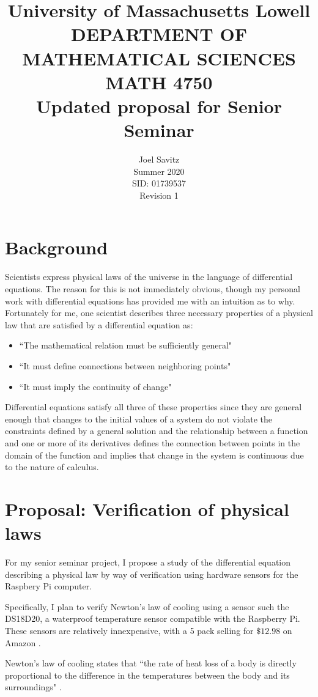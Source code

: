 \documentclass[12pt]{amsart}
\title{ University of Massachusetts Lowell \protect\\
	DEPARTMENT OF MATHEMATICAL SCIENCES \protect\\
MATH 4750 \protect\\
Updated proposal for Senior Seminar}
\author{Joel Savitz \\ Summer  2020 \\ SID: 01739537 \\ Revision 1}
\begin{document}
\maketitle

\section{Background}

Scientists express physical laws of
the universe in the language of differential equations.
The reason for this is not immediately obvious,
though my personal work with differential equations
has provided me with an intuition as to why.
Fortunately for me,
one scientist describes three necessary properties
of a physical law that are satisfied by a differential equation as: 


\begin{itemize}
	\item ``The mathematical relation must be sufficiently general"
	\item ``It must define connections between neighboring points"
	\item ``It must imply the continuity of change"\citep{whydiffeq}
\end{itemize}

Differential equations satisfy all three of these properties
since they are general enough that
changes to the initial values of a system
do not violate the constraints defined by a general solution
and the relationship between a function and one or more of its derivatives
defines the connection between points in the domain of the function
and implies that change in the system is continuous
due to the nature of calculus.

\section{Proposal: Verification of physical laws}

For my senior seminar project,
I propose a study of
the differential equation describing a physical law
by way of verification
using hardware sensors
for the Raspbery Pi computer.

Specifically, I plan to verify Newton's law of cooling
using a sensor such the DS18D20,
a waterproof temperature sensor compatible with the Raspberry Pi.
These sensors are relatively innexpensive,
with a 5 pack selling for $\$12.98$ on Amazon \citep{Amazon}.

Newton's law of cooling states that
``the rate of heat loss of a body is
directly proportional to the difference
in the temperatures between the body and
its surroundings" \citep{wiki}.
\end{document}
